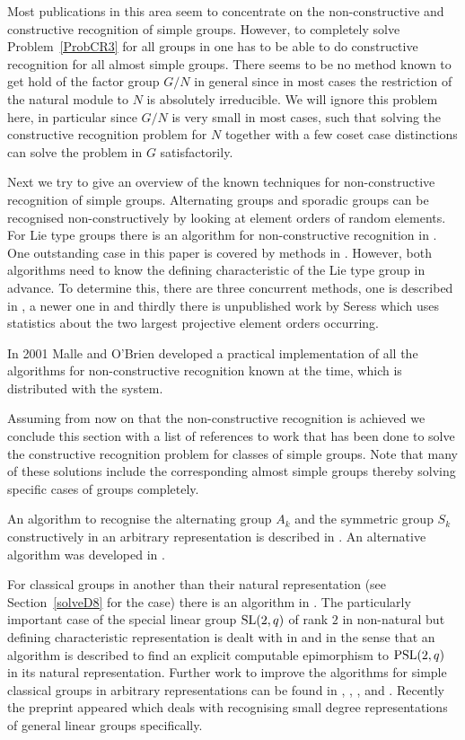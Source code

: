 Most publications in this area seem to concentrate on the
non-constructive and constructive recognition of simple groups.
However, to completely solve Problem~\ref{ProbCR3} for all groups in
 one has to be able to do constructive recognition for all
almost simple groups. There seems to be no method known to get hold of
the factor group $G/N$ in general since in most cases
the restriction of the natural module to $N$ is absolutely
irreducible.  We will ignore this problem here, in particular since $G/N$
is very small in most cases, such that solving the constructive recognition
problem for $N$ together with a few coset case distinctions can solve the
problem in $G$ satisfactorily.

Next we try to give an overview of the known techniques for
non-constructive recognition of simple groups. Alternating groups and
sporadic groups can be recognised non-constructively by looking at
element orders of random elements. For Lie type groups there is an
algorithm for non-constructive recognition in \cite{blackboxlienonconstr}.
One outstanding case in this paper is covered by methods in
\cite{altseimer}. However, both algorithms need to know the defining
characteristic of the Lie type group in advance. To determine this,
there are three concurrent methods, one is described in
\cite{primpowgraphs}, a newer one in \cite{findingcharlie} and thirdly there
is unpublished work by Seress which uses statistics about the two largest 
projective element orders occurring.

In 2001 Malle and O'Brien developed a practical implementation of all 
the algorithms for non-constructive recognition known at the time,
which is distributed with the {\MAGMA} system.

Assuming from now on that the non-constructive recognition is achieved we
conclude this section with a list of references to work that has been done
to solve the constructive recognition problem for classes of simple groups.
Note that many of these solutions include the corresponding almost simple
groups thereby solving specific cases of  groups completely.

An algorithm to recognise the alternating group $A_k$ and the symmetric
group $S_k$ constructively in an arbitrary 
representation is described in \cite{bbsymaltconstr}. An alternative
algorithm was developed in \cite{bratuspak}.

For classical groups in another than their natural representation (see
Section~\ref{solveD8} for the  case) there is an algorithm in
\cite{bbclassical}. The particularly important case of the special linear
group $\SL(2,q)$ of rank $2$ in non-natural but defining characteristic
representation is dealt with in \cite{classicallargefield}
and \cite{psl2qconstr} in the sense that an algorithm is described to find
an explicit computable epimorphism to $\PSL(2,q)$ in its natural
representation. Further work to improve the algorithms for simple classical 
groups in arbitrary representations can be found in \cite{bbomega},
\cite{bbunitary}, \cite{bbpsldq}, \cite{computingmatrix} and
\cite{bbortho}. Recently the preprint \cite{smalldegreegl} appeared which
deals with recognising small degree representations of general linear
groups specifically.

